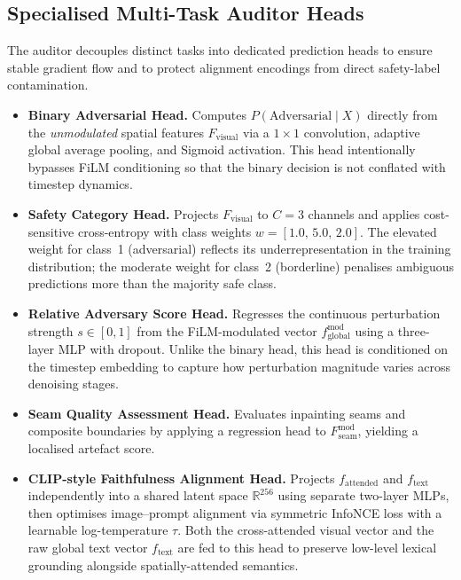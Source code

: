 \subsection{Specialised Multi-Task Auditor Heads}

The auditor decouples distinct tasks into dedicated prediction heads to ensure
stable gradient flow and to protect alignment encodings from direct safety-label
contamination.

\begin{itemize}[leftmargin=*]

\item \textbf{Binary Adversarial Head.}
Computes $P(\text{Adversarial} \mid X)$ directly from the \emph{unmodulated}
spatial features $F_{\text{visual}}$ via a $1{\times}1$ convolution, adaptive
global average pooling, and Sigmoid activation.  This head intentionally
bypasses FiLM conditioning so that the binary decision is not conflated with
timestep dynamics.

\item \textbf{Safety Category Head.}
Projects $F_{\text{visual}}$ to $C=3$ channels and applies cost-sensitive
cross-entropy with class weights $w = [1.0,\,5.0,\,2.0]$.  The elevated weight
for class~1 (adversarial) reflects its underrepresentation in the training
distribution; the moderate weight for class~2 (borderline) penalises
ambiguous predictions more than the majority safe class.

\item \textbf{Relative Adversary Score Head.}
Regresses the continuous perturbation strength $s \in [0,1]$ from the
FiLM-modulated vector $f_{\text{global}}^{\text{mod}}$ using a three-layer MLP
with dropout.  Unlike the binary head, this head is conditioned on the timestep
embedding to capture how perturbation magnitude varies across denoising stages.

\item \textbf{Seam Quality Assessment Head.}
Evaluates inpainting seams and composite boundaries by applying a regression
head to $F_{\text{seam}}^{\text{mod}}$, yielding a localised artefact score.

\item \textbf{CLIP-style Faithfulness Alignment Head.}
Projects $f_{\text{attended}}$ and $f_{\text{text}}$ independently into a
shared latent space $\mathbb{R}^{256}$ using separate two-layer MLPs, then
optimises image--prompt alignment via symmetric InfoNCE loss with a learnable
log-temperature $\tau$.  Both the cross-attended visual vector and the raw
global text vector $f_{\text{text}}$ are fed to this head to preserve low-level
lexical grounding alongside spatially-attended semantics.

\end{itemize}

